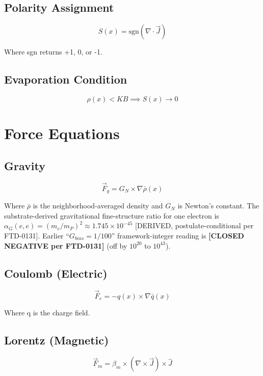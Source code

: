 \documentclass[
  11pt,
  letterpaper,
  twoside,
  openany]{book}
\makeatletter
\let\orig@section\section
\renewcommand{\section}{\needspace{8\baselineskip}\orig@section}
\let\orig@subsection\subsection
\renewcommand{\subsection}{\needspace{6\baselineskip}\orig@subsection}
\makeatother
\begin{document}
\subsection{Polarity Assignment}\label{polarity-assignment}

\[
S(x) = \text{sgn}(\nabla \cdot \vec{J})
\]

Where sgn returns +1, 0, or -1.

\subsection{Evaporation Condition}\label{evaporation-condition}

\[
\rho(x) < KB \implies S(x) \rightarrow 0
\]

\section{Force Equations}\label{force-equations}

\subsection{Gravity}\label{gravity}

\[
\vec{F}_g = G_N \times \nabla\bar{\rho}(x)
\]

Where \(\bar{\rho}\) is the neighborhood-averaged density and \(G_N\) is
Newton's constant. The substrate-derived gravitational fine-structure
ratio for one electron is
\(\alpha_G(e,e) = (m_e/m_P)^2 \approx 1.745 \times 10^{-45}\)
{[}DERIVED, postulate-conditional per FTD-0131{]}. Earlier
``\(G_{bias} = 1/100\)'' framework-integer reading is \textbf{{[}CLOSED
NEGATIVE per FTD-0131{]}} (off by \(10^{20}\) to \(10^{43}\)).

\subsection{Coulomb (Electric)}\label{coulomb-electric}

\[
\vec{F}_e = -q(x) \times \nabla\bar{q}(x)
\]

Where q is the charge field.

\subsection{Lorentz (Magnetic)}\label{lorentz-magnetic}

\[
\vec{F}_m = \beta_m \times (\nabla \times \vec{J}) \times \hat{J}
\]
\end{document}
